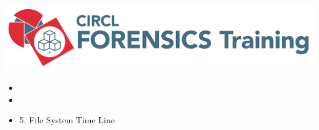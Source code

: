 %
%



\begin{frame}
    \includegraphics[scale=0.3]{images/logo-circl-Forensics.png}
    \begin{itemize}
        \item[]
        \item[]
        \item[] 5. File System Time Line
    \end{itemize}
\end{frame}


